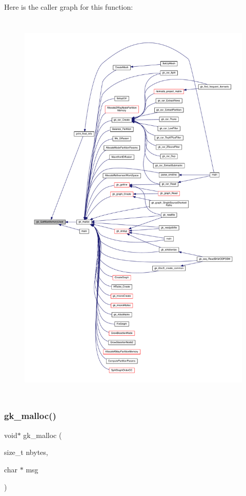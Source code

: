 Here is the caller graph for this function\+:\nopagebreak
\begin{figure}[H]
\begin{center}
\leavevmode
\includegraphics[height=550pt]{a00110_a656fd5266ae12a96e53125486f8fea52_icgraph}
\end{center}
\end{figure}
\mbox{\label{a00110_aba6f76f5c67b9b7e9c2e45988d3d3e9d}} 
\subsubsection{\texorpdfstring{gk\+\_\+malloc()}{gk\_malloc()}}
{\footnotesize\ttfamily void$\ast$ gk\+\_\+malloc (\begin{DoxyParamCaption}\item[{size\+\_\+t}]{nbytes,  }\item[{char $\ast$}]{msg }\end{DoxyParamCaption})}

